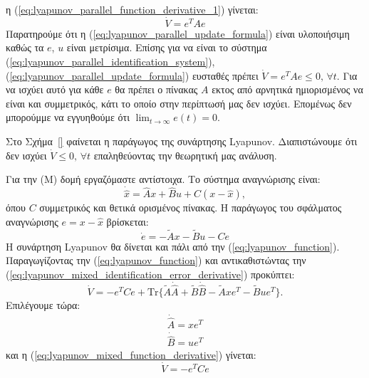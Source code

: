 \documentclass[a4paper,12pt]{article}
\begin{document}
η (\ref{eq:lyapunov_parallel_function_derivative_1}) γίνεται:
\begin{equation*}
    \dot{V} = e^TAe
\end{equation*}
Παρατηρούμε ότι η (\ref{eq:lyapunov_parallel_update_formula}) είναι υλοποιήσιμη καθώς τα $e$, $u$ είναι 
μετρίσιμα. Επίσης για να είναι το σύστημα (\ref{eq:lyapunov_parallel_identification_system}),
(\ref{eq:lyapunov_parallel_update_formula}) ευσταθές πρέπει $\dot{V} = e^TAe \leq 0,\, \forall t$. Για να 
ισχύει αυτό για κάθε $e$ θα πρέπει ο πίνακας $A$ εκτος από αρνητικά ημιορισμένος να είναι και συμμετρικός,
κάτι το οποίο στην περίπτωσή μας δεν ισχύει. Επομένως δεν μπορούμμε να εγγυηθούμε ότι 
$\lim_{t \to \infty}e(t) = 0$.

Στο Σχήμα~\ref{} φαίνεται η παράγωγος της συνάρτησης Lyapunov. 
Διαπιστώνουμε ότι δεν ισχύει $\dot{V} \leq 0, \, \forall t$ επαληθεύοντας την θεωρητική μας ανάλυση.


Για την (Μ) δομή εργαζόμαστε αντίστοιχα. Το σύστημα αναγνώρισης είναι:
\begin{equation}
    \dot{\hat{x}} = \hat{A}x + \hat{B} u + C(x - \hat{x}),
    \label{eq:lyapunov_mixed_identification_system}
\end{equation}
όπου $C$ συμμετρικός και θετικά ορισμένος πίνακας. Η παράγωγος του σφάλματος αναγνώρισης $e = x - \hat{x}$ 
βρίσκεται:
\begin{equation}
    \dot{e} = -\tilde{A}x - \tilde{B}u - Ce
    \label{eq:lyapunov_mixed_identification_error_derivative}
\end{equation}
Η συνάρτηση Lyapunov θα δίνεται και πάλι από την 
(\ref{eq:lyapunov_function}). Παραγωγίζοντας την (\ref{eq:lyapunov_function}) και αντικαθιστώντας
την (\ref{eq:lyapunov_mixed_identification_error_derivative}) προκύπτει:
\begin{equation}
    \dot{V} = -e^TCe + \mathrm{Tr}\{\tilde{A}\dot{\hat{A}} + \tilde{B}\dot{\hat{B}} - 
    \tilde{A}xe^T - \tilde{B}ue^T\}.
    \label{eq:lyapunov_mixed_function_derivative}  
\end{equation}
Επιλέγουμε τώρα:
\begin{equation}
    \begin{aligned}
        \dot{\hat{A}} = xe^T \\ 
        \dot{\hat{B}} = ue^T
    \end{aligned}
    \label{eq:lyapunov_parallel_update_formula}
\end{equation}
και η (\ref{eq:lyapunov_mixed_function_derivative}) γίνεται:
\begin{equation}
    \dot{V} = -e^TCe
\end{equation}
\end{document}
